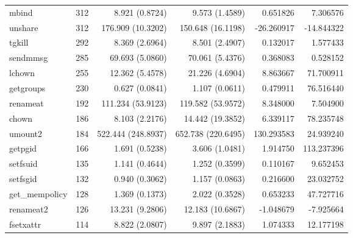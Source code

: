 \begin{longtable}{>{\ttfamily}lrrrrr}
                          mbind &        312 &           8.921 (0.8724) &           9.573 (1.4589) &        0.651826 &     7.306576 \\
                        unshare &        312 &        176.909 (10.3202) &        150.648 (16.1198) &      -26.260917 &   -14.844322 \\
                         tgkill &        292 &           8.369 (2.6964) &           8.501 (2.4907) &        0.132017 &     1.577433 \\
                       sendmmsg &        285 &          69.693 (5.0860) &          70.061 (5.4376) &        0.368083 &     0.528152 \\
                         lchown &        255 &          12.362 (5.4578) &          21.226 (4.6904) &        8.863667 &    71.700911 \\
                      getgroups &        230 &           0.627 (0.0841) &           1.107 (0.0611) &        0.479911 &    76.516440 \\
                       renameat &        192 &        111.234 (53.9123) &        119.582 (53.9572) &        8.348000 &     7.504900 \\
                          chown &        186 &           8.103 (2.2176) &         14.442 (19.3852) &        6.339117 &    78.235748 \\
                        umount2 &        184 &       522.444 (248.8937) &       652.738 (220.6495) &      130.293583 &    24.939240 \\
                        getpgid &        166 &           1.691 (0.5238) &           3.606 (1.0481) &        1.914750 &   113.237396 \\
                       setfsuid &        135 &           1.141 (0.4644) &           1.252 (0.3599) &        0.110167 &     9.652453 \\
                       setfsgid &        132 &           0.940 (0.3062) &           1.157 (0.0863) &        0.216600 &    23.032752 \\
                 get\_mempolicy &        128 &           1.369 (0.1373) &           2.022 (0.3528) &        0.653233 &    47.727716 \\
                      renameat2 &        126 &          13.231 (9.2806) &         12.183 (10.6867) &       -1.048679 &    -7.925664 \\
                      fsetxattr &        114 &           8.822 (2.0807) &           9.897 (2.1883) &        1.074333 &    12.177198 \\

\end{longtable}
